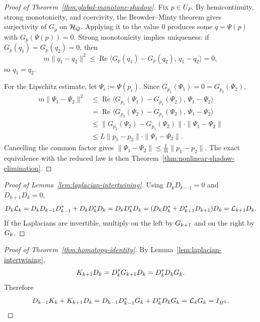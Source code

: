 \begin{proof}[Proof of Theorem~\ref{thm:global-monotone-shadow}]
\label{proof:thm:global-monotone-shadow}
Fix $p\in U_P$. By hemicontinuity, strong monotonicity, and coercivity,
the Browder--Minty theorem gives surjectivity of $G_p$ on $\mathcal{H}_Q$.
Applying it to the value $0$ produces some $q=\Psi(p)$ with
$G_p(\Psi(p))=0$. Strong monotonicity implies uniqueness: if
$G_p(q_1)=G_p(q_2)=0$, then
\[
m\|q_1-q_2\|^2
\le
\operatorname{Re}\langle G_p(q_1)-G_p(q_2),\,q_1-q_2\rangle
=0,
\]
so $q_1=q_2$.

For the Lipschitz estimate, let $\Psi_i:=\Psi(p_i)$. Since
$G_{p_1}(\Psi_1)=0=G_{p_2}(\Psi_2)$,
\begin{align*}
m\|\Psi_1-\Psi_2\|^2
&\le
\operatorname{Re}\langle G_{p_1}(\Psi_1)-G_{p_1}(\Psi_2),\,\Psi_1-\Psi_2\rangle \\
&=
\operatorname{Re}\langle G_{p_2}(\Psi_2)-G_{p_1}(\Psi_2),\,\Psi_1-\Psi_2\rangle \\
&\le
\|G_{p_2}(\Psi_2)-G_{p_1}(\Psi_2)\|\cdot \|\Psi_1-\Psi_2\| \\
&\le
L\|p_1-p_2\|\cdot \|\Psi_1-\Psi_2\|.
\end{align*}
Cancelling the common factor gives
$\|\Psi_1-\Psi_2\|\le \frac{L}{m}\|p_1-p_2\|$.
The exact equivalence with the reduced law is then Theorem~\ref{thm:nonlinear-shadow-elimination}.
\end{proof}


\begin{proof}[Proof of Lemma~\ref{lem:laplacian-intertwining}]
\label{proof:lem:laplacian-intertwining}
Using $D_k D_{k-1} = 0$ and $D_{k+1} D_k = 0$,
\[
D_k \mathcal{L}_{k}
=
D_k D_{k-1} D_{k-1}^* + D_k D_k^* D_k
=
D_k D_k^* D_k
=
(D_k D_k^* + D_{k+1}^* D_{k+1}) D_k
=
\mathcal{L}_{k+1} D_k.
\]
If the Laplacians are invertible, multiply on the left by $G_{k+1}$ and
on the right by $G_{k}$.
\end{proof}

\begin{proof}[Proof of Theorem~\ref{thm:homotopy-identity}]
\label{proof:thm:homotopy-identity}
By Lemma~\ref{lem:laplacian-intertwining},
\[
K_{k+1} D_k
=
D_k^* G_{k+1} D_k
=
D_k^* D_k G_{k}.
\]
Therefore
\[
D_{k-1} K_{k} + K_{k+1} D_k
=
D_{k-1} D_{k-1}^* G_{k} + D_k^* D_k G_{k}
=
\mathcal{L}_{k} G_{k}
=
I_{H^k}.
\]
\end{proof}


